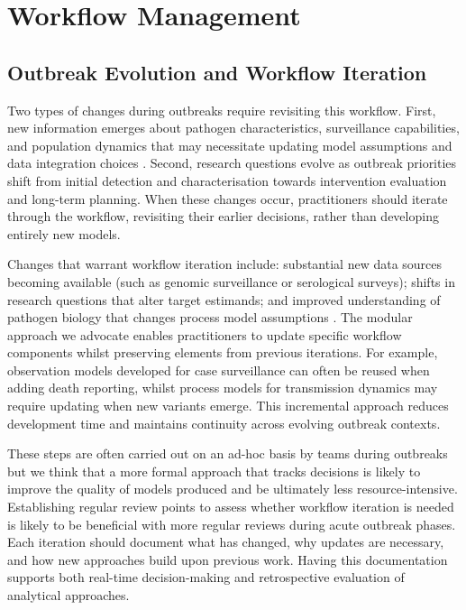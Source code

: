 \documentclass{article}
\begin{document}
\section{Workflow Management}

\subsection{Outbreak Evolution and Workflow Iteration}  \label{sec:outbreak}
Two types of changes during outbreaks require revisiting this workflow.
First, new information emerges about pathogen characteristics, surveillance capabilities, and population dynamics that may necessitate updating model assumptions and data integration choices \citep{mccaw2023role}.
Second, research questions evolve as outbreak priorities shift from initial detection and characterisation towards intervention evaluation and long-term planning.
When these changes occur, practitioners should iterate through the workflow, revisiting their earlier decisions, rather than developing entirely new models.

Changes that warrant workflow iteration include: substantial new data sources becoming available (such as genomic surveillance or serological surveys); shifts in research questions that alter target estimands; and improved understanding of pathogen biology that changes process model assumptions \citep{knock2021key}.
The modular approach we advocate enables practitioners to update specific workflow components whilst preserving elements from previous iterations.
For example, observation models developed for case surveillance can often be reused when adding death reporting, whilst process models for transmission dynamics may require updating when new variants emerge.
This incremental approach reduces development time and maintains continuity across evolving outbreak contexts.

These steps are often carried out on an ad-hoc basis by teams during outbreaks but we think that a more formal approach that tracks decisions is likely to improve the quality of models produced and be ultimately less resource-intensive.
Establishing regular review points to assess whether workflow iteration is needed is likely to be beneficial with more regular reviews during acute outbreak phases.
Each iteration should document what has changed, why updates are necessary, and how new approaches build upon previous work.
Having this documentation supports both real-time decision-making and retrospective evaluation of analytical approaches.
\end{document}
